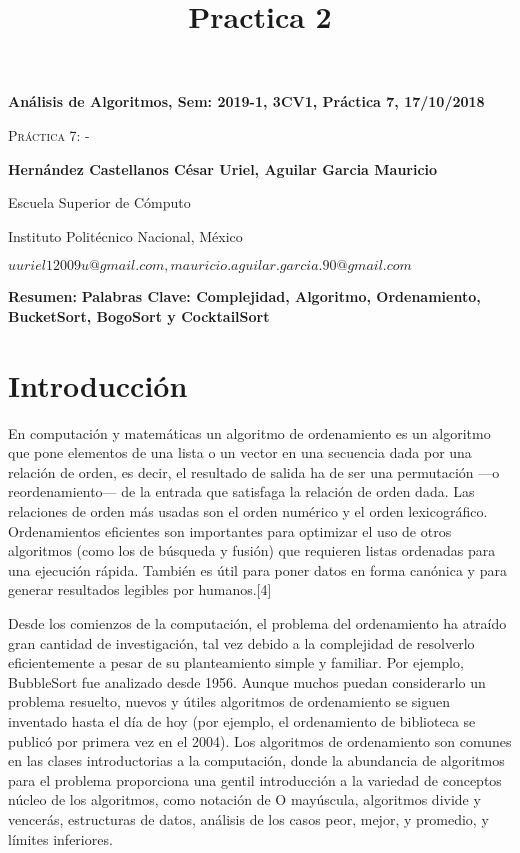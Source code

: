 \documentclass[12pt,twoside]{article}
\title{Practica 2}
\date{}
\begin{document}
\centerline{\bf An\'alisis de Algoritmos, Sem: 2019-1, 3CV1, Pr\'actica 7, 17/10/2018}
\centerline{}
\centerline{}
\begin{center}
\Large{\textsc{Pr\'actica 7:  -}}
\end{center}
\centerline{}
\centerline{\bf {Hern\'andez Castellanos C\'esar Uriel, Aguilar Garcia Mauricio}}
\centerline{}
\centerline{Escuela Superior de C\'omputo}
\centerline{Instituto Polit\'ecnico Nacional, M\'exico}
\centerline{$uuriel12009u@gmail.com, mauricio.aguilar.garcia.90@gmail.com$}
\newtheorem{Theorem}{\quad Theorem}[section]
\newtheorem{Definition}[Theorem]{\quad Definition}
\newtheorem{Corollary}[Theorem]{\quad Corollary}
\newtheorem{Lemma}[Theorem]{\quad Lemma}
\newtheorem{Example}[Theorem]{\quad Example}
\bigskip
\textbf{Resumen: } 
\textbf{Palabras Clave: Complejidad, Algoritmo, Ordenamiento, BucketSort, BogoSort y CocktailSort }
\section{Introducción}

En computación y matemáticas un algoritmo de ordenamiento es un algoritmo que pone elementos de una lista o un vector en una secuencia dada por una relación de orden, es decir, el resultado de salida ha de ser una permutación —o reordenamiento— de la entrada que satisfaga la relación de orden dada. Las relaciones de orden más usadas son el orden numérico y el orden lexicográfico. Ordenamientos eficientes son importantes para optimizar el uso de otros algoritmos (como los de búsqueda y fusión) que requieren listas ordenadas para una ejecución rápida. También es útil para poner datos en forma canónica y para generar resultados legibles por humanos.[4]

Desde los comienzos de la computación, el problema del ordenamiento ha atraído gran cantidad de investigación, tal vez debido a la complejidad de resolverlo eficientemente a pesar de su planteamiento simple y familiar. Por ejemplo, BubbleSort fue analizado desde 1956. Aunque muchos puedan considerarlo un problema resuelto, nuevos y útiles algoritmos de ordenamiento se siguen inventado hasta el día de hoy (por ejemplo, el ordenamiento de biblioteca se publicó por primera vez en el 2004). Los algoritmos de ordenamiento son comunes en las clases introductorias a la computación, donde la abundancia de algoritmos para el problema proporciona una gentil introducción a la variedad de conceptos núcleo de los algoritmos, como notación de O mayúscula, algoritmos divide y vencerás, estructuras de datos, análisis de los casos peor, mejor, y promedio, y límites inferiores. 
\end{document}
